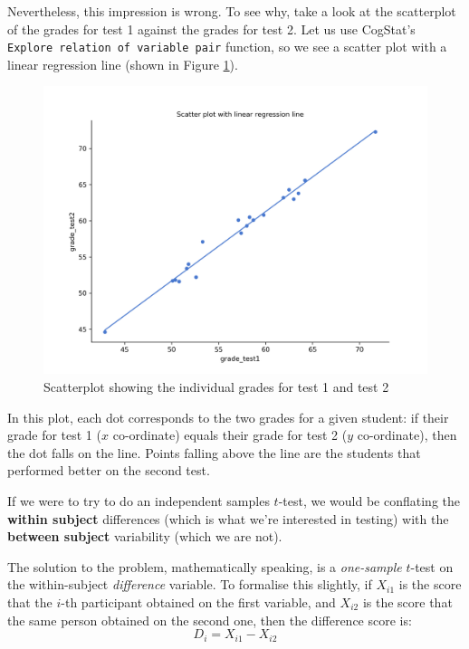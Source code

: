 \documentclass[
]{book}
\theoremstyle{definition}
\theoremstyle{definition}
\theoremstyle{definition}
\theoremstyle{definition}
\theoremstyle{remark}
\begin{document}
Nevertheless, this impression is wrong. To see why, take a look at the scatterplot of the grades for test 1 against the grades for test 2. Let us use CogStat's \texttt{Explore\ relation\ of\ variable\ pair} function, so we see a scatter plot with a linear regression line (shown in Figure \ref{fig:pairedtb}).

\begin{figure}

{\centering \includegraphics[width=0.66\linewidth]{resources/image/cogstatchicoscatter} 

}

\caption{Scatterplot showing the individual grades for test 1 and test 2}\label{fig:pairedtb}
\end{figure}

In this plot, each dot corresponds to the two grades for a given student: if their grade for test 1 (\(x\) co-ordinate) equals their grade for test 2 (\(y\) co-ordinate), then the dot falls on the line. Points falling above the line are the students that performed better on the second test.

If we were to try to do an independent samples \(t\)-test, we would be conflating the \textbf{within subject} differences (which is what we're interested in testing) with the \textbf{between subject} variability (which we are not).

The solution to the problem, mathematically speaking, is a \emph{one-sample} \(t\)-test on the within-subject \emph{difference} variable. To formalise this slightly, if \(X_{i1}\) is the score that the \(i\)-th participant obtained on the first variable, and \(X_{i2}\) is the score that the same person obtained on the second one, then the difference score is:
\[
D_{i} = X_{i1} - X_{i2}
\]
\end{document}
